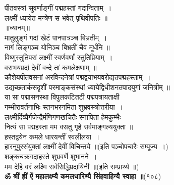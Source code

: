 \documentclass[twoside,top=1.7cm, bottom=1.7cm, outer=1cm,landscape, inner=1.5cm,a5paper,]{book}
\begin{document}
\begin{center}पीतवस्त्रां सुवर्णाङ्गीं पद्महस्तां गदान्विताम्~।\\
लक्ष्मीं ध्यायेत मन्त्रेण स भवेत् पृथिवीपतिः ॥\\[10pt]
॥ध्यानम्॥\\
मातुलुङ्गं गदां खेटं पानपात्रञ्च बिभ्रतीम्~।\\
नागं लिङ्गञ्च योनिञ्च बिभ्रतीं चैव मूर्धनि ॥\\[10pt]
विष्णुस्तुतिपरां लक्ष्मीं  स्वर्णवर्णां स्तुतिप्रियाम्~।\\
वराभयप्रदां देवीं वन्दे तां कमलेक्षणाम् ॥\\[10pt]
कौशेयपीतवसनां अरविन्दनेत्रां पद्मद्वयाभयवरोद्यतपद्महस्ताम्~।\\
उद्यच्छतार्कसदृशीं परमाङ्कसंस्थां ध्यायेद्विधीशनतपादयुगां जनित्रीम् ॥\\[10pt]
या सा पद्मासनस्था विपुलकटितटी पद्मपत्रायताक्षी\\
गम्भीरावर्तनाभिः स्तनभरनमिता शुभ्रवस्त्रोत्तरीया~।\\[10pt]
लक्ष्मीर्दिव्यैर्गजेन्द्रैर्मणिगणखचितैः स्नापिता हेमकुम्भैः\\
नित्यं सा पद्महस्ता मम वसतु गृहे सर्वमाङ्गल्ययुक्ता ॥\\
\newpage
हस्तद्वयेन कमले धारयन्तीं स्वलीलया~।\\
हारनूपुरसंयुक्तां लक्ष्मीं देवीं विचिन्तये ॥(इति पञ्चोपचारैः सम्पूज्य~।)\\[10pt]
शङ्कचक्रगदाहस्ते शुभ्रवर्णे शुभानने~।\\
मम देहि वरं लक्ष्मि सर्वसिद्धिप्रदायिनी ॥(इति सम्प्रार्थ्य ॥)\\[10pt]
{\bfseries ॐ श्रीं ह्रीं ऐं महालक्ष्म्यै कमलधारिण्यै सिंहवाहिन्यै स्वाहा ॥}(१०८)


\end{center}
\end{document}
